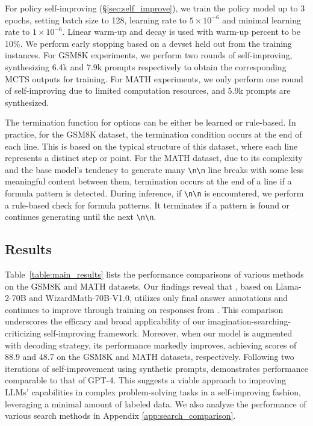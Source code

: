For policy self-improving (\S \ref{sec:self_improve}), we train the policy model up to 3 epochs, setting batch size to 128, learning rate to $5\times 10^{-6}$ and minimal learning rate to $1\times 10^{-6}$.
Linear warm-up and decay is used with warm-up percent to be 10\%.
We perform early stopping based on a devset held out from the training instances.
For GSM8K experiments, we perform two rounds of self-improving, synthesizing 6.4k and 7.9k prompts\citep{yu2023metamath} respectively to obtain the corresponding MCTS outputs for training.
For MATH experiments, we only perform one round of self-improving due to limited computation resources, and 5.9k prompts are synthesized.

The termination function for options can be either be learned or rule-based. In practice, for the GSM8K dataset, the termination condition occurs at the end of each line. This is based on the typical structure of this dataset, where each line represents a distinct step or point. For the MATH dataset, due to its complexity and the base model's tendency to generate many \texttt{\textbackslash n\textbackslash n} line breaks with some less meaningful content between them, termination occurs at the end of a line if a formula pattern is detected. During inference, if \texttt{\textbackslash n\textbackslash n} is encountered, we perform a rule-based check for formula patterns. It terminates if a pattern is found or continues generating until the next \texttt{\textbackslash n\textbackslash n}.


\subsection{Results}


Table~\ref{table:main_results} lists the performance comparisons of various methods on the GSM8K and MATH datasets. Our findings reveal that \model{}, based on Llama-2-70B and WizardMath-70B-V1.0, utilizes only final answer annotations and continues to improve through training on responses from \emcts{}. This comparison underscores the efficacy and broad applicability of our imagination-searching-criticizing self-improving framework. Moreover, when our model is augmented with \emcts{} decoding strategy, its performance markedly improves, achieving scores of 88.9 and 48.7 on the GSM8K and MATH datasets, respectively. Following two iterations of self-improvement using synthetic prompts, \model{} demonstrates performance comparable to that of GPT-4. This suggests a viable approach to improving LLMs' capabilities in complex problem-solving tasks in a self-improving fashion, leveraging a minimal amount of labeled data. We also analyze the performance of various search methods in Appendix \ref{app:search_comparison}.


